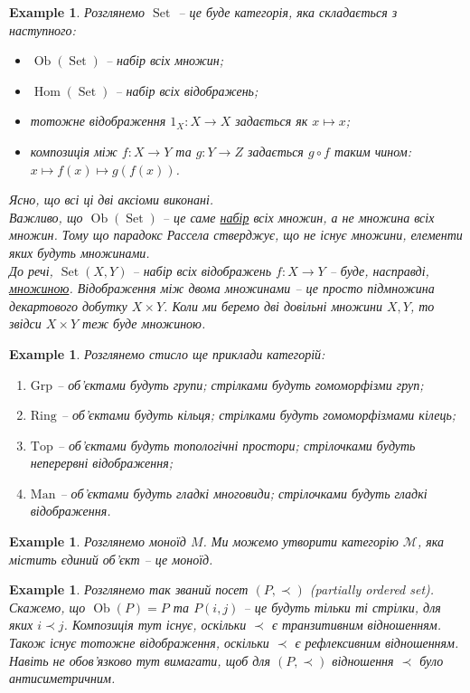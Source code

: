 \documentclass[a4paper, 10pt]{article}
\theoremstyle{theoremdd}
\newtheorem{example}[theorem]{Example}
\DeclareMathOperator{\Ob}{Ob}
\DeclareMathOperator{\Hom}{Hom}
\DeclareMathOperator{\Set}{Set}
\begin{document}
\begin{example}
Розглянемо $\Set$ -- це буде категорія, яка складається з наступного:
\begin{itemize}[nosep, wide=0pt, label={--}]
\item $\Ob(\Set)$ -- набір всіх множин;
\item $\Hom(\Set)$ -- набір всіх відображень;
\item тотожне відображення $1_X \colon X \to X$ задається як $x \mapsto x$;
\item композиція між $f \colon X \to Y$ та $g \colon Y \to Z$ задається $g \circ f$ таким чином: $x \mapsto f(x) \mapsto g(f(x))$.
\end{itemize}
Ясно, що всі ці дві аксіоми виконані.
\bigskip \\
Важливо, що $\Ob(\Set)$ -- це саме \underline{набір} всіх множин, а не множина всіх множин. Тому що парадокс Рассела стверджує, що не існує множини, елементи яких будуть множинами.\\
До речі, $\Set(X,Y)$ -- набір всіх відображень $f \colon X \to Y$ -- буде, насправді, \underline{множиною}. Відображення між двома множинами -- це просто підмножина декартового добутку $X \times Y$. Коли ми беремо дві довільні множини $X,Y$, то звідси $X \times Y$ теж буде множиною.
\end{example}

\begin{example}
Розглянемо стисло ще приклади категорій:
\begin{enumerate}[nosep,wide=0pt,label={\arabic*)}]
\item $\text{Grp}$ -- об'єктами будуть групи; стрілками будуть гомоморфізми груп;
\item $\text{Ring}$ -- об'єктами будуть кільця; стрілками будуть гомоморфізмами кілець;
\item $\text{Top}$ -- об'єктами будуть топологічні простори; стрілочками будуть неперервні відображення;
\item $\text{Man}$ -- об'єктами будуть гладкі многовиди; стрілочками будуть гладкі відображення.
\end{enumerate}
\end{example}

\begin{example}
Розглянемо моноїд $M$. Ми можемо утворити категорію $\mathcal{M}$, яка містить єдиний об'єкт -- це моноїд.
\end{example}

\begin{example}
Розглянемо так званий посет $(P,\prec)$ (partially ordered set). Скажемо, що $\Ob(P) = P$ та $P(i,j)$ -- це будуть тільки ті стрілки, для яких $i \prec j$. Композиція тут існує, оскільки $\prec$ є транзитивним відношенням. Також існує тотожне відображення, оскільки $\prec$ є рефлексивним відношенням.\\
\textit{Навіть не обов'язково тут вимагати, щоб для $(P,\prec)$ відношення $\prec$ було антисиметричним.}
\end{example}
\end{document}
